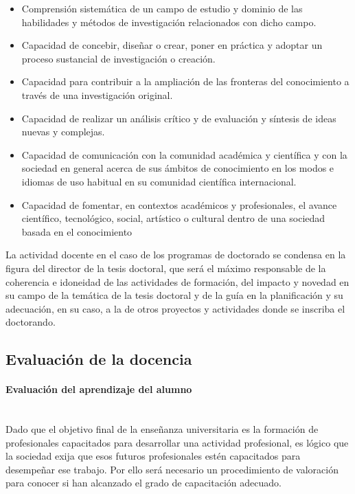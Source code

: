 \begin{itemize}
    \item Comprensión sistemática de un campo de estudio y dominio de las habilidades y
métodos de investigación relacionados con dicho campo.
\item Capacidad de concebir, diseñar o crear, poner en práctica y adoptar un proceso
sustancial de investigación o creación.
\item Capacidad para contribuir a la ampliación de las fronteras del conocimiento a través
de una investigación original.
\item Capacidad de realizar un análisis crítico y de evaluación y síntesis de ideas nuevas y
complejas.
\item Capacidad de comunicación con la comunidad académica y científica y con la sociedad en general acerca de sus ámbitos de conocimiento en los modos e idiomas de uso habitual en su comunidad científica internacional.
\item Capacidad de fomentar, en contextos académicos y profesionales, el avance científico,
tecnológico, social, artístico o cultural dentro de una sociedad basada en el conocimiento
\end{itemize}

La actividad docente en el caso de los programas de doctorado se condensa en la figura del director de la tesis doctoral, que será el máximo responsable de la coherencia e idoneidad de las actividades de formación, del impacto y novedad en su campo de la temática de la tesis doctoral y de la guía en la planificación y su adecuación, en su caso, a la de otros proyectos y actividades donde se inscriba el doctorando. 


\subsection{Evaluación de la docencia} \label{sec:evaluadoc}

\paragraph{Evaluación del aprendizaje del alumno\\\\} \label{sec:evaluacion_alumno}

Dado que el objetivo final de la enseñanza universitaria es la formación de profesionales capacitados para desarrollar una actividad profesional, es lógico que la sociedad exija que esos futuros profesionales estén capacitados para desempeñar ese trabajo. Por ello será necesario un procedimiento de valoración para conocer si han alcanzado el grado de capacitación adecuado.

